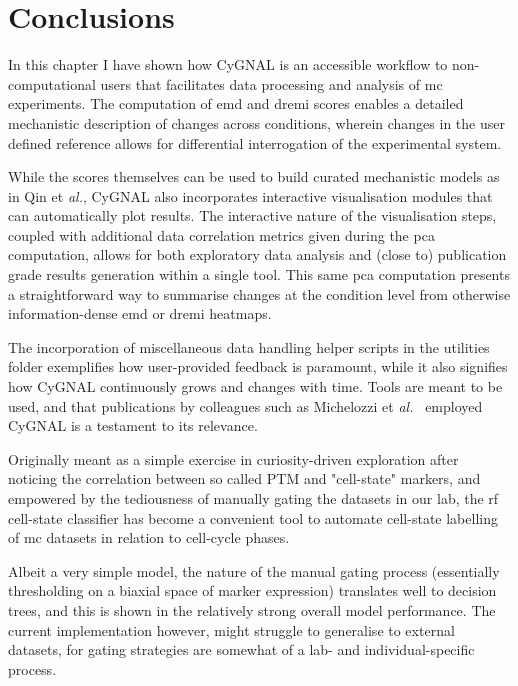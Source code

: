 \newpage
\section{Conclusions}

In this chapter I have shown how CyGNAL is an accessible workflow to non-computational users that facilitates data processing and analysis of \acrshort{mc} experiments. The computation of \acrshort{emd} and \acrshort{dremi} scores enables a detailed mechanistic description of changes across conditions, wherein changes in the user defined reference allows for differential interrogation of the experimental system. 

While the scores themselves can be used to build curated mechanistic models as in Qin et \emph{al.}\cite{qin_cell-type-specific_2020}, CyGNAL also incorporates interactive visualisation modules that can automatically plot results. The interactive nature of the visualisation steps, coupled with additional data correlation metrics given during the \acrshort{pca} computation, allows for both exploratory data analysis and (close to) publication grade results generation within a single tool. This same \acrshort{pca} computation presents a straightforward way to summarise changes at the condition level from otherwise information-dense \acrshort{emd} or \acrshort{dremi} heatmaps.

The incorporation of miscellaneous data handling helper scripts in the utilities folder exemplifies how user-provided feedback is paramount, while it also signifies how CyGNAL continuously grows and changes with time. Tools are meant to be used, and that publications by colleagues such as Michelozzi et \emph{al.}~\cite{michelozzi_activation_2023} employed CyGNAL is a testament to its relevance.

Originally meant as a simple exercise in curiosity-driven exploration after noticing the correlation between so called PTM and "cell-state" markers, and empowered by the tediousness of manually gating the datasets in our lab, the \acrshort{rf} cell-state classifier has become a convenient tool to automate cell-state labelling of \acrshort{mc} datasets in relation to cell-cycle phases.

Albeit a very simple model, the nature of the manual gating process (essentially thresholding on a biaxial space of marker expression) translates well to decision trees, and this is shown in the relatively strong overall model performance. The current implementation however, might struggle to generalise to external datasets, for gating strategies are somewhat of a lab- and individual-specific process.

